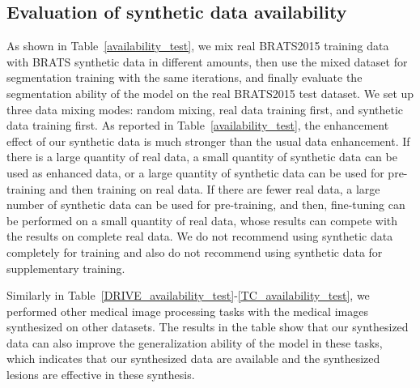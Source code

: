 \documentclass[runningheads]{llncs}
\begin{document}
	\subsection{Evaluation of synthetic data availability}
	As shown in Table~\ref{availability_test}, we mix real BRATS2015 training data with BRATS synthetic data in different amounts, then use the mixed dataset for segmentation training with the same iterations, and finally evaluate the segmentation ability of the model on the real BRATS2015 test dataset. We set up three data mixing modes: random mixing, real data training first, and synthetic data training first. As reported in Table~\ref{availability_test}, the enhancement effect of our synthetic data is much stronger than the usual data enhancement. If there is a large quantity of real data, a small quantity of synthetic data can be used as enhanced data, or a large quantity of synthetic data can be used for pre-training and then training on real data. If there are fewer real data, a large number of synthetic data can be used for pre-training, and then, fine-tuning can be performed on a small quantity of real data, whose results can compete with the results on complete real data.  We do not recommend using synthetic data completely for training and also do not recommend using synthetic data for supplementary training.
	
	Similarly in Table~\ref{DRIVE_availability_test}-\ref{TC_availability_test}, we performed other medical image processing tasks with the medical images synthesized on other datasets. The results in the table show that our synthesized data can also improve the generalization ability of the model in these tasks, which indicates that our synthesized data are available and the synthesized lesions are effective in these synthesis.
\end{document}
